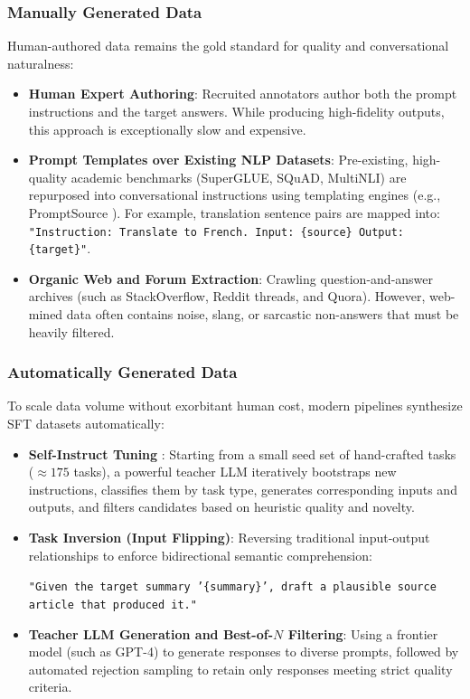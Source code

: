 \documentclass[../../main.tex]{subfiles}
\begin{document}
\subsubsection{Manually Generated Data}
Human-authored data remains the gold standard for quality and conversational naturalness:
\begin{itemize}
    \item \textbf{Human Expert Authoring}: Recruited annotators author both the prompt instructions and the target answers. While producing high-fidelity outputs, this approach is exceptionally slow and expensive.
    \item \textbf{Prompt Templates over Existing NLP Datasets}: Pre-existing, high-quality academic benchmarks (SuperGLUE, SQuAD, MultiNLI) are repurposed into conversational instructions using templating engines (e.g., PromptSource \citep{bach2022promptsource}). For example, translation sentence pairs are mapped into: \texttt{"Instruction: Translate to French. Input: \{source\} Output: \{target\}"}.
    \item \textbf{Organic Web and Forum Extraction}: Crawling question-and-answer archives (such as StackOverflow, Reddit threads, and Quora). However, web-mined data often contains noise, slang, or sarcastic non-answers that must be heavily filtered.
\end{itemize}

\subsubsection{Automatically Generated Data}
To scale data volume without exorbitant human cost, modern pipelines synthesize SFT datasets automatically:
\begin{itemize}
    \item \textbf{Self-Instruct Tuning} \citep{wang2023selfinstruct}: Starting from a small seed set of hand-crafted tasks ($\approx 175$ tasks), a powerful teacher LLM iteratively bootstraps new instructions, classifies them by task type, generates corresponding inputs and outputs, and filters candidates based on heuristic quality and novelty.
    \item \textbf{Task Inversion (Input Flipping)}: Reversing traditional input-output relationships to enforce bidirectional semantic comprehension:
    \begin{center}
    \texttt{"Given the target summary '\{summary\}', draft a plausible source article that produced it."}
    \end{center}
    \item \textbf{Teacher LLM Generation and Best-of-$N$ Filtering}: Using a frontier model (such as GPT-4) to generate responses to diverse prompts, followed by automated rejection sampling to retain only responses meeting strict quality criteria.
\end{itemize}
\end{document}
